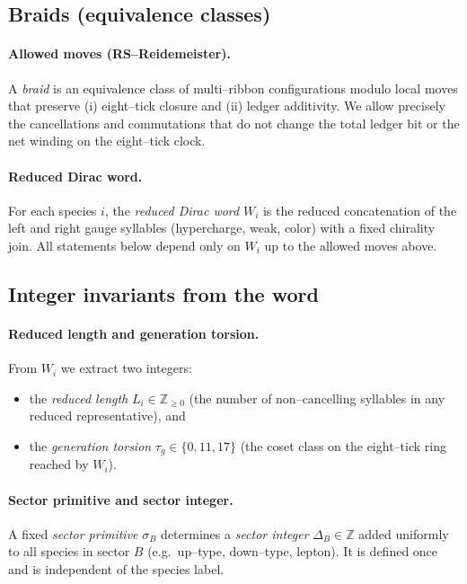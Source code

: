 \documentclass[epjc3]{svjour3}
\begin{document}
\subsection{Braids (equivalence classes)}
\paragraph{Allowed moves (RS--Reidemeister).}
A \emph{braid} is an equivalence class of multi--ribbon configurations modulo local moves that preserve (i) eight--tick closure and (ii) ledger additivity.  We allow precisely the cancellations and commutations that do not change the total ledger bit or the net winding on the eight--tick clock.

\paragraph{Reduced Dirac word.}
For each species $i$, the \emph{reduced Dirac word} $W_i$ is the reduced concatenation of the left and right gauge syllables (hypercharge, weak, color) with a fixed chirality join.  All statements below depend only on $W_i$ up to the allowed moves above.

\subsection{Integer invariants from the word}
\paragraph{Reduced length and generation torsion.}
From $W_i$ we extract two integers:
\begin{itemize}
  \item the \emph{reduced length} $L_i\in\mathbb{Z}_{\ge 0}$ (the number of non--cancelling syllables in any reduced representative), and
  \item the \emph{generation torsion} $\tau_g\in\{0,11,17\}$ (the coset class on the eight--tick ring reached by $W_i$).
\end{itemize}

\paragraph{Sector primitive and sector integer.}
A fixed \emph{sector primitive} $\sigma_B$ determines a \emph{sector integer} $\Delta_B\in\mathbb{Z}$ added uniformly to all species in sector $B$ (e.g.\ up--type, down--type, lepton).  It is defined once and is independent of the species label.
\end{document}
